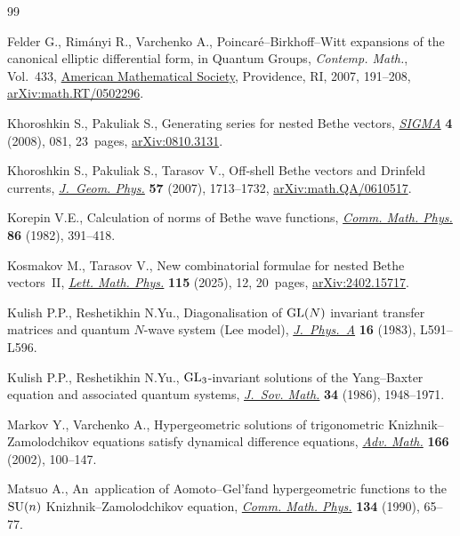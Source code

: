 \begin{thebibliography}{99}
\footnotesize\itemsep=0pt

Felder G., Rim\'anyi R., Varchenko A., Poincar\'e--{B}irkhoff--{W}itt
 expansions of the canonical elliptic differential form, in Quantum Groups,
 \textit{Contemp. Math.}, Vol.~433,
 \href{https://doi.org/10.1090/conm/433/08327}{American Mathematical Society}, Providence, RI, 2007, 191--208,
 \href{http://arxiv.org/abs/math.RT/0502296}{arXiv:math.RT/0502296}.

Khoroshkin S., Pakuliak S., Generating series for nested {B}ethe vectors,
 \href{https://doi.org/10.3842/SIGMA.2008.081}{\textit{SIGMA}} \textbf{4}
 (2008), 081, 23~pages,
 \href{http://arxiv.org/abs/0810.3131}{arXiv:0810.3131}.

Khoroshkin S., Pakuliak S., Tarasov V., Off-shell {B}ethe vectors and
 {D}rinfeld currents,
 \href{https://doi.org/10.1016/j.geomphys.2007.02.005}{\textit{J.~Geom.
 Phys.}} \textbf{57} (2007), 1713--1732,
 \href{http://arxiv.org/abs/math.QA/0610517}{arXiv:math.QA/0610517}.

Korepin V.E., Calculation of norms of {B}ethe wave functions,
 \href{https://doi.org/10.1007/BF01212176}{\textit{Comm. Math. Phys.}}
 \textbf{86} (1982), 391--418.

Kosmakov M., Tarasov V., New combinatorial formulae for nested {B}ethe
 vectors~{II}, \href{https://doi.org/10.1007/s11005-025-01896-2}{\textit{Lett.
 Math. Phys.}} \textbf{115} (2025), 12, 20~pages,
 \href{http://arxiv.org/abs/2402.15717}{arXiv:2402.15717}.

Kulish P.P., Reshetikhin N.Yu., Diagonalisation of {${\rm GL}(N)$} invariant
 transfer matrices and quantum {$N$}-wave system ({L}ee model),
 \href{https://doi.org/10.1088/0305-4470/16/16/001}{\textit{J.~Phys.~A}}
 \textbf{16} (1983), L591--L596.

Kulish P.P., Reshetikhin N.Yu., {${\rm GL}_{3}$}-invariant solutions of the
 {Y}ang--{B}axter equation and associated quantum systems,
 \href{https://doi.org/10.1007/BF01095104}{\textit{J.~Sov. Math.}} \textbf{34}
 (1986), 1948--1971.

Markov Y., Varchenko A., Hypergeometric solutions of trigonometric
 {K}nizhnik--{Z}amolodchikov equations satisfy dynamical difference equations,
 \href{https://doi.org/10.1006/aima.2001.2027}{\textit{Adv. Math.}}
 \textbf{166} (2002), 100--147.

Matsuo A., An~application of {A}omoto--{G}el'fand hypergeometric functions to
 the {${\rm SU}(n)$} {K}nizhnik--{Z}amolodchikov equation,
 \href{https://doi.org/10.1007/BF02102089}{\textit{Comm. Math. Phys.}}
 \textbf{134} (1990), 65--77.


\end{thebibliography}
